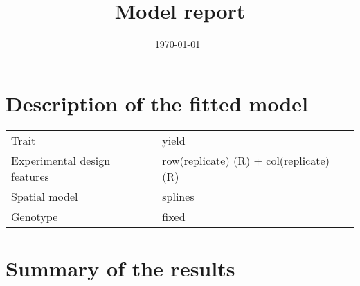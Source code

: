 \documentclass[a4paper,11pt]{article}\usepackage[]{graphicx}\usepackage[]{color}
\title{Model report}%
\author{\vspace{-5ex}}
\date{\today\ \currenttime} %
\makeatletter
\def\@abstractline{\textwidth}
\renewenvironment{abstract}
{
\ifhmode\begingroup\parskip0pt\par\noindent\endgroup\fi%
\begin{rmfamily}
{\noindent\bfseries\large\abstractname\vspace{-0.5em}}
{\par\vbox{\hrule width \@abstractline}}
}{
\ifhmode\begingroup\parskip0pt\par\noindent\endgroup\fi %
\par\vbox{\hrule width \@abstractline}%
\end{rmfamily}
}
\makeatother
\begin{document}



\maketitle

\singlespacing



\section{Description of the fitted model}

\begin{table}[ht]
\begin{flushleft}
\begin{tabular}{ll}
  Trait & yield \\ 
  Experimental design features & row(replicate) (R) + col(replicate) (R) \\ 
  Spatial model & splines \\ 
  Genotype & fixed \\ 
  \end{tabular}
\label{modelDescription}
\end{flushleft}
\end{table}


\section{Summary of the results}
\end{document}

